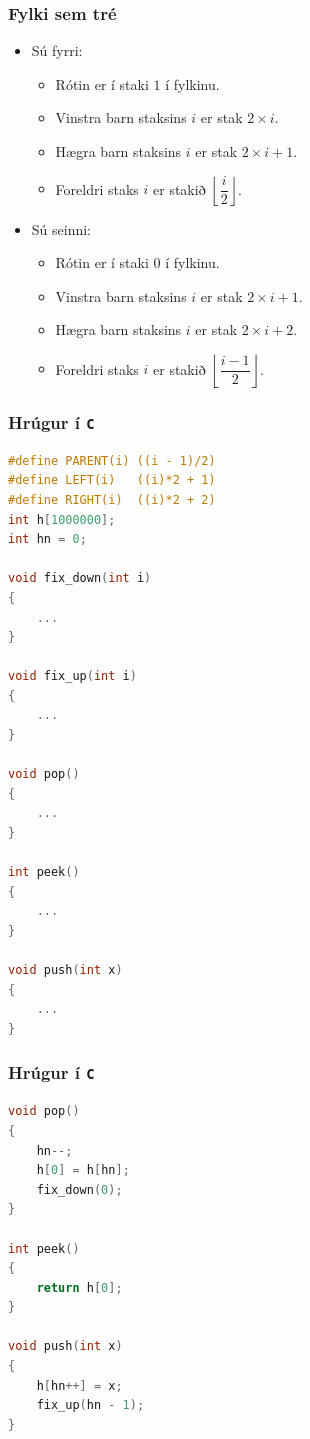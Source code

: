 \documentclass{beamer}
\begin{document}
\begin{frame}
\frametitle{Fylki sem tré}
\begin{itemize}

\item<1-> Sú fyrri:
	\begin{itemize}
		\item<2-> Rótin er í staki $1$ í fylkinu.
		\item<3-> Vinstra barn staksins $i$ er stak $2\times i$.
		\item<4-> Hægra barn staksins $i$ er stak $2\times i + 1$.
		\item<5-> Foreldri staks $i$ er stakið $\left \lfloor \dfrac{i}{2} \right \rfloor$.
	\end{itemize}
\item<6-> Sú seinni:
	\begin{itemize}
		\item<7-> Rótin er í staki $0$ í fylkinu.
		\item<8-> Vinstra barn staksins $i$ er stak $2\times i + 1$.
		\item<9-> Hægra barn staksins $i$ er stak $2\times i + 2$.
		\item<10-> Foreldri staks $i$ er stakið $\left \lfloor \dfrac{i - 1}{2} \right \rfloor$.
	\end{itemize}

\end{itemize}
\end{frame}

\begin{frame}[fragile]
	\frametitle{Hrúgur í \texttt{C}}
	\tiny
	\begin{lstlisting}[language=C]
#define PARENT(i) ((i - 1)/2)
#define LEFT(i)   ((i)*2 + 1)
#define RIGHT(i)  ((i)*2 + 2)
int h[1000000];
int hn = 0;

void fix_down(int i)
{
	...
}

void fix_up(int i)
{
	...
}

void pop()
{
	...
}

int peek()
{
	...
}

void push(int x)
{
	...
}
\end{lstlisting}
\end{frame}

\begin{frame}[fragile]
	\frametitle{Hrúgur í \texttt{C}}
	\tiny
	\begin{lstlisting}[language=C]
void pop()
{
	hn--;
	h[0] = h[hn];
	fix_down(0);
}

int peek()
{
	return h[0];
}

void push(int x)
{
	h[hn++] = x;
	fix_up(hn - 1);
}
\end{lstlisting}
\end{frame}
\end{document}
